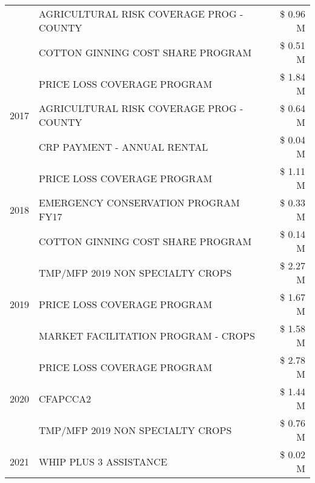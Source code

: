 \begin{tabular}{llr}
 & AGRICULTURAL RISK COVERAGE PROG - COUNTY & \$ 0.96 M \\
 & COTTON GINNING COST SHARE PROGRAM & \$ 0.51 M \\
\cline{1-3}
\multirow[t]{3}{*}{2017} & PRICE LOSS COVERAGE PROGRAM & \$ 1.84 M \\
 & AGRICULTURAL RISK COVERAGE PROG - COUNTY & \$ 0.64 M \\
 & CRP PAYMENT - ANNUAL RENTAL & \$ 0.04 M \\
\cline{1-3}
\multirow[t]{3}{*}{2018} & PRICE LOSS COVERAGE PROGRAM & \$ 1.11 M \\
 & EMERGENCY CONSERVATION PROGRAM FY17 & \$ 0.33 M \\
 & COTTON GINNING COST SHARE PROGRAM & \$ 0.14 M \\
\cline{1-3}
\multirow[t]{3}{*}{2019} & TMP/MFP 2019 NON SPECIALTY CROPS & \$ 2.27 M \\
 & PRICE LOSS COVERAGE PROGRAM & \$ 1.67 M \\
 & MARKET FACILITATION PROGRAM - CROPS & \$ 1.58 M \\
\cline{1-3}
\multirow[t]{3}{*}{2020} & PRICE LOSS COVERAGE PROGRAM & \$ 2.78 M \\
 & CFAPCCA2 & \$ 1.44 M \\
 & TMP/MFP 2019 NON SPECIALTY CROPS & \$ 0.76 M \\
\cline{1-3}
2021 & WHIP PLUS 3 ASSISTANCE & \$ 0.02 M \\
\cline{1-3}
\bottomrule
\end{tabular}
